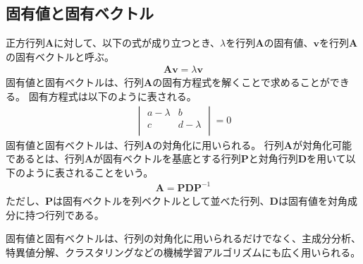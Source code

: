 \documentclass{ltjsarticle}
\begin{document}
\subsection{固有値と固有ベクトル}
正方行列$\mathbf{A}$に対して、以下の式が成り立つとき、$\lambda$を行列$\mathbf{A}$の固有値、$\mathbf{v}$を行列$\mathbf{A}$の固有ベクトルと呼ぶ。
\begin{align}
\mathbf{A} \mathbf{v} = \lambda \mathbf{v}
\end{align}
固有値と固有ベクトルは、行列$\mathbf{A}$の固有方程式を解くことで求めることができる。
固有方程式は以下のように表される。
\begin{align}
\begin{vmatrix}
  a - \lambda & b \\
  c & d - \lambda \\
\end{vmatrix}
= 0
\end{align}
固有値と固有ベクトルは、行列$\mathbf{A}$の対角化に用いられる。
行列$\mathbf{A}$が対角化可能であるとは、行列$\mathbf{A}$が固有ベクトルを基底とする行列$\mathbf{P}$と対角行列$\mathbf{D}$を用いて以下のように表されることをいう。
\begin{align}
\mathbf{A} = \mathbf{P} \mathbf{D} \mathbf{P}^{-1}
\end{align}
ただし、$\mathbf{P}$は固有ベクトルを列ベクトルとして並べた行列、$\mathbf{D}$は固有値を対角成分に持つ行列である。
\par
固有値と固有ベクトルは、行列の対角化に用いられるだけでなく、主成分分析、特異値分解、クラスタリングなどの機械学習アルゴリズムにも広く用いられる。

\newpage
\end{document}
